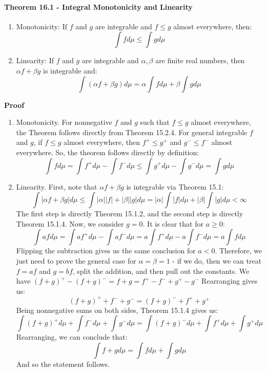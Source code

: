 \documentclass[12pt,a4paper]{article}
\newcommand{\1}[1]{\mathbbm{1}\left\{ #1 \right\}}
\begin{document}
\paragraph{Theorem 16.1 - Integral Monotonicity and Linearity}
\begin{enumerate}
	\item Monotonicity: If $f$ and $g$ are integrable and $f \leq g$ almost everywhere, then:
	$$
		\int f d\mu \leq \int g d\mu
	$$
	
	\item Linearity: If $f$ and $g$ are integrable and $\alpha,\beta$ are finite real numbers, then $\alpha f + \beta g$ is integrable and:
	$$
		\int (\alpha f + \beta g) d\mu =
		\alpha \int f d\mu + \beta \int g d\mu
	$$
\end{enumerate}
\textbf{Proof}
\begin{enumerate}
	\item Monotonicity. For nonnegative $f$ and $g$ such that $f \leq g$ almost everywhere, the Theorem follows directly from Theorem 15.2.4. For general integrable $f$ and $g$, if $f \leq g$ almost everywhere, then $f^+ \leq g^+$ and $g^- \leq f^-$ almost everywhere. So, the theorem follows directly by definition:
	$$
		\int f d\mu =
		\int f^+ d\mu - \int f^- d\mu \leq
		\int g^+ d\mu - \int g^- d\mu =
		\int g d\mu
	$$
	
	\item Linearity. First, note that $\alpha f + \beta g$ is integrable via Theorem 15.1:
	$$
		\int |\alpha f + \beta g|d\mu \leq
		\int |\alpha||f| + |\beta||g| d\mu =
		|\alpha| \int |f| d\mu + |\beta| \int |g| d\mu < \infty
	$$
	The first step is directly Theorem 15.1.2, and the second step is directly Theorem 15.1.4. Now, we consider $g = 0$. It is clear that for $a \geq 0$:
	$$
		\int af d\mu = \int af^+ d\mu - \int af^- d\mu = a\int f^+ d\mu - a\int f^- d\mu = a\int f d\mu
	$$
	Flipping the subtraction gives us the same conclusion for $a < 0$. Therefore, we just need to prove the general case for $\alpha = \beta = 1$ - if we do, then we can treat $f = af$ and $g = bf$, split the addition, and then pull out the constants. We have $(f + g)^+ - (f + g)^- = f + g = f^+ - f^- + g^+ - g^-$ Rearranging gives us:
	$$
		(f + g)^+ + f^- + g^- = (f + g)^- + f^+ + g^+
	$$
	Being nonnegative sums on both sides, Theorem 15.1.4 gives us:
	$$
		\int (f + g)^+ d\mu + \int f^- d\mu + \int g^- d\mu =
		\int (f + g)^- d\mu + \int f^+ d\mu + \int g^+ d\mu
	$$
	Rearranging, we can conclude that:
	$$
		\int f + g d\mu = \int f d\mu + \int g d\mu
	$$
	And so the statement follows. 
\end{enumerate}
\end{document}

